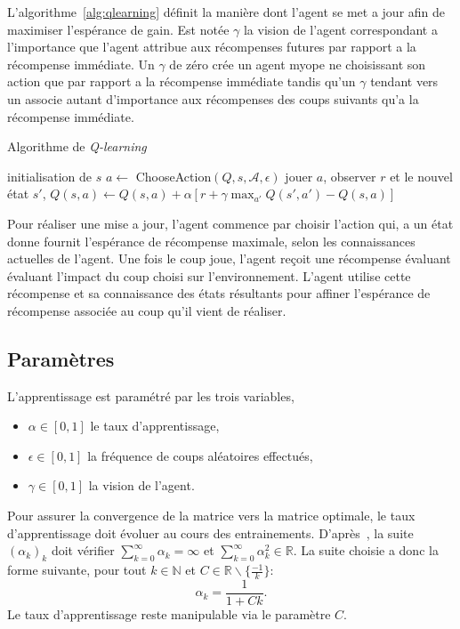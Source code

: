 \documentclass{report}
\newcommand{\R}{\mathbb{R}}
\begin{document}
L'algorithme~\ref{alg:qlearning} définit la manière dont l'agent se met a jour
afin de maximiser l'espérance de gain. Est notée \(\gamma\) la vision de
l'agent correspondant a l'importance que l'agent attribue aux récompenses
futures par rapport a la récompense immédiate. Un \(\gamma\) de zéro crée un
agent myope ne choisissant son action que par rapport a la récompense immédiate
tandis qu'un \(\gamma\) tendant vers un associe autant d'importance aux
récompenses des coups suivants qu'a la récompense immédiate.
\begin{algorithm}
  \caption{Algorithme de \textit{Q-learning}}\label{alg:qlearning}
  \begin{algorithmic}
    [1]
    \Repeat{}
    \State{} initialisation de \(s\)
    \Repeat{}
    \State{} \(a \gets\) ChooseAction$(Q, s, \mathcal{A}, \epsilon)$
    \State{} jouer \(a\), observer \(r\) et le nouvel \'etat \(s'\),
    \State{} \(Q(s, a) \gets Q(s, a) + \alpha\left[ r + \gamma \max_{a'}
      Q(s', a') - Q(s, a)\right]\)
    \EndProcedure{}
  \end{algorithmic}
\end{algorithm}

Pour réaliser une mise a jour, l'agent commence par choisir l'action qui, a un
état donne fournit l'espérance de récompense maximale, selon les connaissances
actuelles de l'agent. Une fois le coup joue, l'agent reçoit une récompense
évaluant évaluant l'impact du coup choisi sur l'environnement. L'agent utilise
cette récompense et sa connaissance des états résultants pour affiner
l'espérance de récompense associée au coup qu'il vient de réaliser.

\subsection{Paramètres}
L'apprentissage est paramétré par les trois variables,
\begin{itemize}
  \item \(\alpha \in [0, 1]\) le taux d'apprentissage,
  \item \(\epsilon \in [0, 1]\) la fréquence de coups aléatoires effectués,
  \item \(\gamma \in [0, 1]\) la vision de l'agent.
\end{itemize}
Pour assurer la convergence de la matrice vers la matrice optimale,
le taux d'apprentissage doit évoluer au cours des entrainements.
D'après~\cite{watkins92}, la suite \( (\alpha_k)_k \) doit vérifier
\( \sum_{k=0}^\infty \alpha_k = \infty \) et \(
\sum_{k=0}^\infty \alpha_k^2 \in \R \). La suite choisie a donc la forme
suivante, pour tout \( k \in \mathbb{N} \) et
\( C \in \R \backslash \{ \frac{-1}{k} \} \):
\[
  \alpha_k = \frac{1}{1 + Ck}.
\]
Le taux d'apprentissage reste manipulable via le paramètre \( C \).
\end{document}
